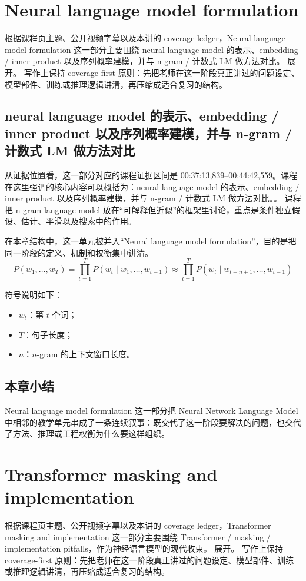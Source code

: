\documentclass[a4paper]{article}
\begin{document}
\section{Neural language model formulation}
根据课程页主题、公开视频字幕以及本讲的 coverage ledger，Neural language model formulation 这一部分主要围绕 neural language model 的表示、embedding / inner product 以及序列概率建模，并与 n-gram / 计数式 LM 做方法对比。 展开。
写作上保持 coverage-first 原则：先把老师在这一阶段真正讲过的问题设定、模型部件、训练或推理逻辑讲清，再压缩成适合复习的结构。

\subsection{neural language model 的表示、embedding / inner product 以及序列概率建模，并与 n-gram / 计数式 LM 做方法对比}
从证据位置看，这一部分对应的课程证据区间是 00:37:13,839--00:44:42,559。课程在这里强调的核心内容可以概括为：neural language model 的表示、embedding / inner product 以及序列概率建模，并与 n-gram / 计数式 LM 做方法对比。。
课程把 n-gram language model 放在“可解释但近似”的框架里讨论，重点是条件独立假设、估计、平滑以及搜索中的作用。

在本章结构中，这一单元被并入“Neural language model formulation”，目的是把同一阶段的定义、机制和权衡集中讲清。
\[
P(w_1,\dots,w_T) = \prod_{t=1}^{T} P(w_t \mid w_1,\dots,w_{t-1}) \approx \prod_{t=1}^{T} P(w_t \mid w_{t-n+1},\dots,w_{t-1})
\]

符号说明如下：
\begin{itemize}
\item $w_t$：第 $t$ 个词；
\item $T$：句子长度；
\item $n$：$n$-gram 的上下文窗口长度。
\end{itemize}

\subsection{本章小结}
Neural language model formulation 这一部分把 Neural Network Language Model 中相邻的教学单元串成了一条连续叙事：既交代了这一阶段要解决的问题，也交代了方法、推理或工程权衡为什么要这样组织。

\section{Transformer masking and implementation}
根据课程页主题、公开视频字幕以及本讲的 coverage ledger，Transformer masking and implementation 这一部分主要围绕 Transformer / masking / implementation pitfalls，作为神经语言模型的现代收束。 展开。
写作上保持 coverage-first 原则：先把老师在这一阶段真正讲过的问题设定、模型部件、训练或推理逻辑讲清，再压缩成适合复习的结构。
\end{document}
